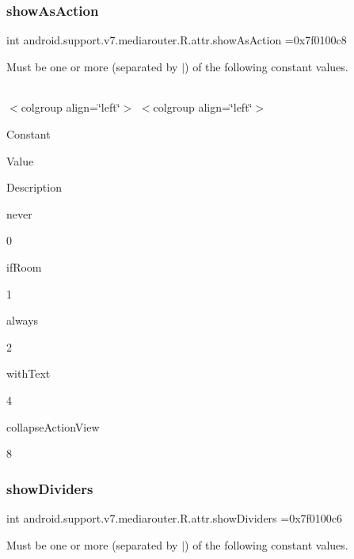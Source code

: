 \subsubsection{\texorpdfstring{show\+As\+Action}{showAsAction}}
{\footnotesize\ttfamily int android.\+support.\+v7.\+mediarouter.\+R.\+attr.\+show\+As\+Action =0x7f0100c8\hspace{0.3cm}{\ttfamily [static]}}

Must be one or more (separated by \textquotesingle{}$\vert$\textquotesingle{}) of the following constant values.

\tabulinesep=1mm
\begin{longtabu} spread 0pt [c]{*{0}{|X[-1]}|}
\hline
\end{longtabu}
$<$colgroup align=\char`\"{}left\char`\"{}$>$ $<$colgroup align=\char`\"{}left\char`\"{}$>$ 

Constant

Value

Description 

{\ttfamily never}

0

{\ttfamily if\+Room}

1

{\ttfamily always}

2

{\ttfamily with\+Text}

4

{\ttfamily collapse\+Action\+View}

8\mbox{\label{classandroid_1_1support_1_1v7_1_1mediarouter_1_1R_1_1attr_a15ec98a1d65d2408a839345928a6c59d}} 
\subsubsection{\texorpdfstring{show\+Dividers}{showDividers}}
{\footnotesize\ttfamily int android.\+support.\+v7.\+mediarouter.\+R.\+attr.\+show\+Dividers =0x7f0100c6\hspace{0.3cm}{\ttfamily [static]}}

Must be one or more (separated by \textquotesingle{}$\vert$\textquotesingle{}) of the following constant values.

